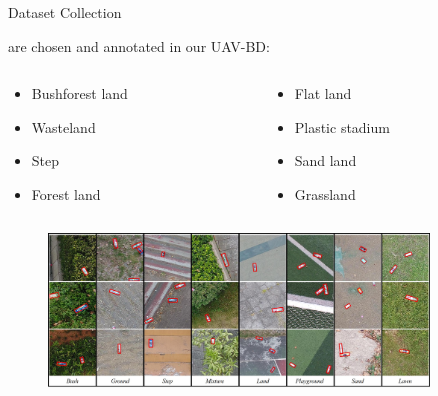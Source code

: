 \documentclass[newPxFont,fullfooter,sectionpages, progressbar]{beamer}
\begin{document}

\begin{frame}{Dataset Collection}

	 are chosen and annotated in our UAV-BD:

	\begin{columns}[c]
		\begin{column}{0.3\textwidth}
			\begin{itemize}
			\item \small{Bushforest land}
			\item \small{Wasteland}
			\item \small{Step}
			\item \small{Forest land}
			\end{itemize}
		\end{column}

		\begin{column}{0.3\textwidth}
			\begin{itemize}
			\item \small{Flat land}
			\item \small{Plastic stadium}
			\item \small{Sand land}
			\item \small{Grassland}
			\end{itemize}
		\end{column}
	\end{columns}
	\begin{figure}
		\centering
		\includegraphics[width=0.9\textwidth]{images/dataset1.jpg}
	\end{figure}

\end{frame}

\end{document}
